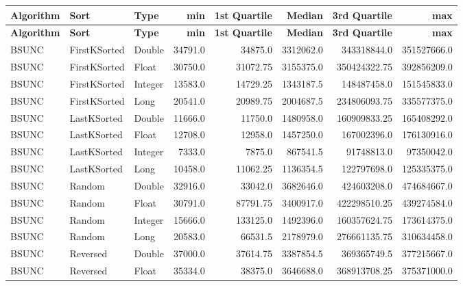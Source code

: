 \documentclass[unicode,11pt,a4paper,oneside,numbers=endperiod,openany]{scrartcl}
\begin{document}
    \begin{center}
        \begin{longtable}{|l|l|l|r|r|r|r|r|}
            \hline
            \textbf{Algorithm} & \textbf{Sort} & \textbf{Type} & \textbf{min} & \textbf{1st Quartile} & \textbf{Median} & \textbf{3rd Quartile} & \textbf{max} \\
            \hline
            \endfirsthead
            \hline
            \textbf{Algorithm} & \textbf{Sort} & \textbf{Type} & \textbf{min} & \textbf{1st Quartile} & \textbf{Median} & \textbf{3rd Quartile} & \textbf{max} \\
            \hline
            \endhead
            \hline
            \endfoot
            BSUNC & FirstKSorted & Double & 34791.0 & 34875.0 & 3312062.0 & 343318844.0 & 351527666.0 \\
            BSUNC & FirstKSorted & Float & 30750.0 & 31072.75 & 3155375.0 & 350424322.75 & 392856209.0 \\
            BSUNC & FirstKSorted & Integer & 13583.0 & 14729.25 & 1343187.5 & 148487458.0 & 151545833.0 \\
            BSUNC & FirstKSorted & Long & 20541.0 & 20989.75 & 2004687.5 & 234806093.75 & 335577375.0 \\
            BSUNC & LastKSorted & Double & 11666.0 & 11750.0 & 1480958.0 & 160909833.25 & 165408292.0 \\
            BSUNC & LastKSorted & Float & 12708.0 & 12958.0 & 1457250.0 & 167002396.0 & 176130916.0 \\
            BSUNC & LastKSorted & Integer & 7333.0 & 7875.0 & 867541.5 & 91748813.0 & 97350042.0 \\
            BSUNC & LastKSorted & Long & 10458.0 & 11062.25 & 1136354.5 & 122797698.0 & 125335375.0 \\
            BSUNC & Random & Double & 32916.0 & 33042.0 & 3682646.0 & 424603208.0 & 474684667.0 \\
            BSUNC & Random & Float & 30791.0 & 87791.75 & 3400917.0 & 422298510.25 & 439274584.0 \\
            BSUNC & Random & Integer & 15666.0 & 133125.0 & 1492396.0 & 160357624.75 & 173614375.0 \\
            BSUNC & Random & Long & 20583.0 & 66531.5 & 2178979.0 & 276661135.75 & 310634458.0 \\
            BSUNC & Reversed & Double & 37000.0 & 37614.75 & 3387854.5 & 369365749.5 & 377215667.0 \\
            BSUNC & Reversed & Float & 35334.0 & 38375.0 & 3646688.0 & 368913708.25 & 375371000.0 \\

\end{longtable}
\end{center}
\end{document}
